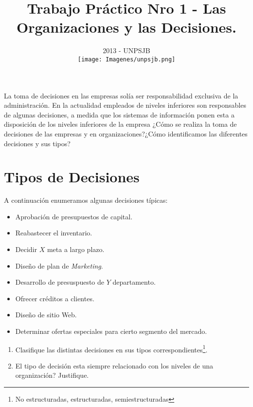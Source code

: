 \documentclass{article}
\begin{document}
\begin{large}
\title{\bf {Trabajo Práctico Nro 1 - Las Organizaciones y las Decisiones.}}
\end{large}
\date{2013 - UNPSJB\\[1cm]\texttt{[image: Imagenes/unpsjb.png]}}

\maketitle
\newpage


La toma de decisiones en las empresas solía ser responsabilidad exclusiva de la administración. En la actualidad empleados de niveles inferiores son responsables de algunas decisiones, a medida que los sistemas de información ponen esta a disposición de los niveles inferiores de la empresa ¿Cómo se realiza la toma de decisiones de las empresas y en organizaciones?¿Cómo identificamos las diferentes decisiones y sus tipos?

\section{Tipos de Decisiones}
A continuación enumeramos algunas decisiones típicas:
\begin{itemize}
    \item Aprobación de presupuestos de capital.
    \item Reabastecer el inventario.
    \item Decidir $X$ meta a largo plazo.
    \item Diseño de plan de \emph{Marketing}.
    \item Desarrollo de presuspuesto de $Y$ departamento.
    \item Ofrecer créditos a clientes.
    \item Diseño de sitio Web.
    \item Determinar ofertas especiales para cierto segmento del mercado.
\end{itemize}
\begin{enumerate}
    \item Clasifique las distintas decisiones en sus tipos correspondientes\footnote{No estructuradas, estructuradas, semiestructuradas}.
    \item El tipo de decisión esta siempre relacionado con los niveles de una organización? Justifique.
\end{enumerate}
\end{document}
